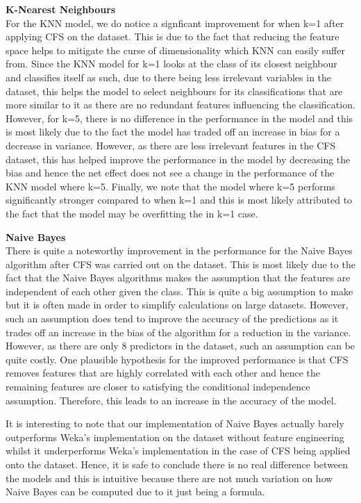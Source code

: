 \documentclass[12pt]{article}
\begin{document}
\textbf{K-Nearest Neighbours}\\
For the KNN model, we do notice a signficant improvement for when k=1 after applying CFS on the dataset. This is due to the fact that reducing the feature space helps to mitigate the curse of dimensionality which KNN can easily suffer from. Since the KNN model for k=1 looks at the class of its closest neighbour and classifies itself as such, due to there being less irrelevant variables in the dataset, this helps the model to select neighbours for its classifications that are more similar to it as there are no redundant features influencing the classification. However, for k=5, there is no difference in the performance in the model and this is most likely due to the fact the model has traded off an increase in bias for a decrease in variance. However, as there are less irrelevant features in the CFS dataset, this has helped improve the performance in the model by decreasing the bias and hence the net effect does not see a change in the performance of the KNN model where k=5. Finally, we note that the model where k=5 performs significantly stronger compared to when k=1 and this is most likely attributed to the fact that the model may be overfitting the in k=1 case.

\textbf{Naive Bayes}\\
There is quite a noteworthy improvement in the performance for the Naive Bayes algorithm after CFS was carried out on the dataset. This is most likely due to the fact that the Naive Bayes algorithms makes the assumption that the features are independent of each other given the class. This is quite a big assumption to make but it is often made in order to simplify calculations on large datasets. However, such an assumption does tend to improve the accuracy of the predictions as it trades off an increase in the bias of the algorithm for a reduction in the variance. However, as there are only 8 predictors in the dataset, such an assumption can be quite costly. One plausible hypothesis for the improved performance is that CFS removes features that are highly correlated with each other and hence the remaining features are closer to satisfying the conditional independence assumption. Therefore, this leads to an increase in the accuracy of the model.

It is interesting to note that our implementation of Naive Bayes actually barely outperforms Weka's implementation on the dataset without feature engineering whilst it underperforms Weka's implementation in the case of CFS being applied onto the dataset. Hence, it is safe to conclude there is no real difference between the models and this is intuitive because there are not much variation on how Naive Bayes can be computed due to it just being a formula.
\end{document}
